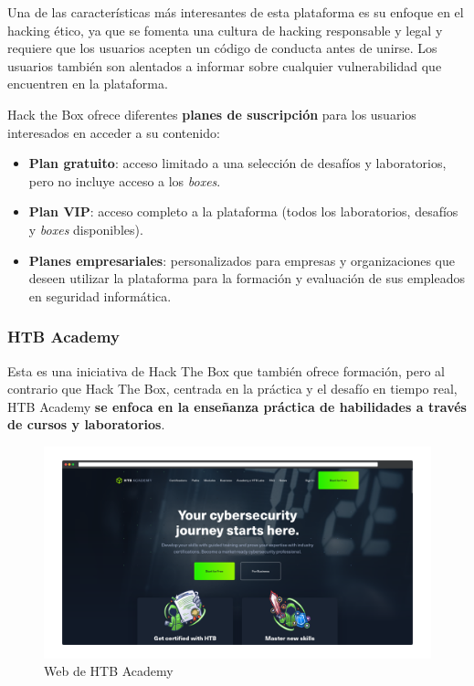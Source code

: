             Una de las características más interesantes de esta plataforma es su enfoque en el hacking ético, ya que se fomenta una cultura de hacking responsable y legal y requiere que los usuarios acepten un código de conducta antes de unirse. Los usuarios también son alentados a informar sobre cualquier vulnerabilidad que encuentren en la plataforma.
            
            Hack the Box ofrece diferentes \textbf{planes de suscripción} para los usuarios interesados en acceder a su contenido:
            
            \begin{itemize}
                \item \textbf{Plan gratuito}: acceso limitado a una selección de desafíos y laboratorios, pero no incluye acceso a los \textit{boxes}.
            
                \item \textbf{Plan VIP}: acceso completo a la plataforma (todos los laboratorios, desafíos y \textit{boxes} disponibles).
            
                \item \textbf{Planes empresariales}: personalizados para empresas y organizaciones que deseen utilizar la plataforma para la formación y evaluación de sus empleados en seguridad informática.
            \end{itemize}
            
            \newpage

        
        \subsubsection{HTB Academy}
        
            Esta es una iniciativa de Hack The Box que también ofrece formación, pero al contrario que Hack The Box, centrada en la práctica y el desafío en tiempo real, HTB Academy \textbf{se enfoca en la enseñanza práctica de habilidades a través de cursos y laboratorios}.
            
            \begin{figure}[h]
                \centering

                \includegraphics[width=\textwidth]{images/Capturas/Web de HTB Academy.png}
                
                \caption{Web de HTB Academy}
                \label{fig:HTB-Academy-web}
            \end{figure}
            
